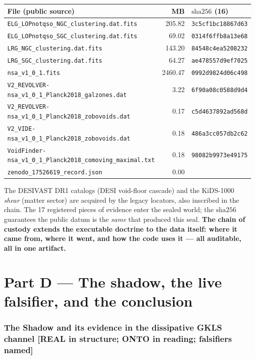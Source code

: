 \documentclass[11pt]{article}
\theoremstyle{definition}\newtheorem{deriv}{Derivation}
\begin{document}
\begin{center}\footnotesize\begin{longtable}{@{}p{}rl@{}}\toprule File (public source) & MB & $\mathrm{sha}256$ (16) \\ \midrule\endhead \texttt{ELG\_LOPnotqso\_NGC\_clustering.dat.fits} & 205.82 & \texttt{3c5cf1bc18867d63} \\  \texttt{ELG\_LOPnotqso\_SGC\_clustering.dat.fits} & 69.02 & \texttt{0314f6ffb8a13e68} \\  \texttt{LRG\_NGC\_clustering.dat.fits} & 143.20 & \texttt{84548c4ea5208232} \\  \texttt{LRG\_SGC\_clustering.dat.fits} & 64.27 & \texttt{ae478557d9ef7025} \\  \texttt{nsa\_v1\_0\_1.fits} & 2460.47 & \texttt{0992d9824d06c498} \\  \texttt{V2\_REVOLVER-nsa\_v1\_0\_1\_Planck2018\_galzones.dat} & 3.22 & \texttt{6f90a08c0588d9d4} \\  \texttt{V2\_REVOLVER-nsa\_v1\_0\_1\_Planck2018\_zobovoids.dat} & 0.17 & \texttt{c5d4637892ad568d} \\  \texttt{V2\_VIDE-nsa\_v1\_0\_1\_Planck2018\_zobovoids.dat} & 0.18 & \texttt{486a3cc057db2c62} \\  \texttt{VoidFinder-nsa\_v1\_0\_1\_Planck2018\_comoving\_maximal.txt} & 0.18 & \texttt{98082b9973e49175} \\  \texttt{zenodo\_17526619\_record.json} & 0.00 & \texttt{} \\ \bottomrule\end{longtable}\end{center}

The DESIVAST DR1 catalogs (DESI void-floor cascade) and the KiDS-1000 \emph{shear} (matter sector) are acquired by the legacy locators, also inscribed in the chain. The 17 registered pieces of evidence enter the sealed world; the $\mathrm{sha}256$ guarantees the public datum is the \emph{same} that produced this seal. \textbf{The chain of custody extends the executable doctrine to the data itself: where it came from, where it went, and how the code uses it --- all auditable, all in one artifact.}

\part{Part D --- The shadow, the live falsifier, and the conclusion}

\section{The Shadow and its evidence in the dissipative GKLS channel \textsf{[REAL in structure; ONTO in reading; falsifiers named]}}
\end{document}

